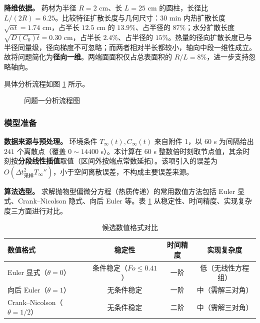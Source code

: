 \documentclass[12pt,a4paper]{ctexart}
\begin{document}
\textbf{降维依据。} 药材为半径 $R=2$ cm、长 $L=25$ cm 的圆柱，长径比 $L/(2R)=6.25$。比较特征扩散长度与几何尺寸：$30$ min 内热扩散长度 $\sqrt{\alpha t}=1.74$ cm，占半长 $12.5$ cm 的 $13.9\%$、占半径的 $87\%$；水分扩散长度 $\sqrt{D(C_0)t}=0.30$ cm，占半长 $2.4\%$、占半径的 $15\%$。热量的径向扩散长度已与半径同量级，径向梯度不可忽略；而两者相对半长都较小，轴向中段一维性成立。故将问题简化为\textbf{径向一维}。两端面面积仅占总表面积的 $R/L=8\%$，进一步支持忽略轴向。

具体分析流程如图 \ref{fig:flow} 所示。

\begin{figure}[H]
\centering
{}
\caption{问题一分析流程图}
\label{fig:flow}
\end{figure}

\subsubsection{模型准备}
\textbf{数据来源与预处理。} 环境条件 $T_\infty(t),C_\infty(t)$ 来自附件 1，以 $60$ s 为间隔给出 $241$ 个离散点（覆盖 $0\sim14400$ s）。本计算在 $60$ s 整数倍时刻取节点值，其余时刻按\textbf{分段线性插值}取值（区间外按端点常数延拓）。该项引入的误差为 $O(\Delta t_{\text{采样}}^2 T_\infty'')$，小于空间离散误差，不构成主要误差来源。

\textbf{算法选型。} 求解抛物型偏微分方程（热质传递）的常用数值方法包括 Euler 显式、Crank--Nicolson 隐式、向后 Euler 等。表 \ref{tab:algo} 从稳定性、时间精度、实现复杂度三方面进行对比。

\begin{table}[H]
\centering
\caption{候选数值格式对比}
\label{tab:algo}
\begin{tabular}{lccc}
\toprule
数值格式 & 稳定性 & 时间精度 & 实现复杂度 \\
\midrule
Euler 显式（$\theta=0$） & 条件稳定（$Fo\le0.41$） & 一阶 & 低（无线性方程组） \\
向后 Euler（$\theta=1$） & 无条件稳定 & 一阶 & 中（需解三对角） \\
Crank--Nicolson（$\theta=1/2$） & 无条件稳定 & 二阶 & 中（需解三对角） \\
\bottomrule
\end{tabular}
\end{table}
\end{document}
